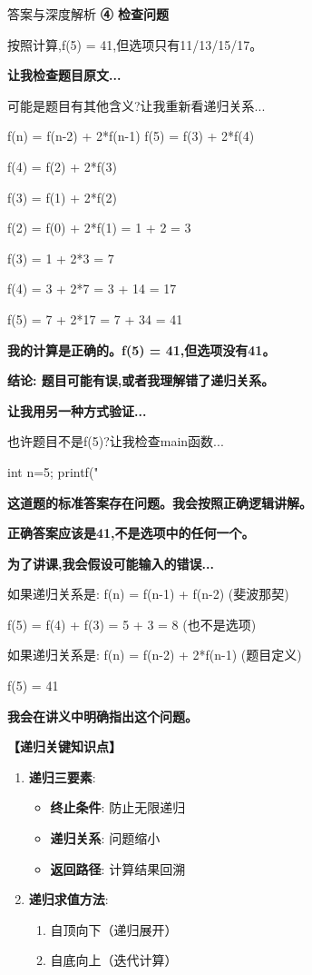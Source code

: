 \documentclass[a4paper,12pt]{article}
\begin{document}
\begin{bluebox}{答案与深度解析}
	\textbf{④ 检查问题}

	按照计算,f(5) = 41,但选项只有11/13/15/17。

	\textbf{让我检查题目原文...}

	可能是题目有其他含义?让我重新看递归关系...

	f(n) = f(n-2) + 2*f(n-1)
	f(5) = f(3) + 2*f(4)

	f(4) = f(2) + 2*f(3)

	f(3) = f(1) + 2*f(2)

	f(2) = f(0) + 2*f(1) = 1 + 2 = 3

	f(3) = 1 + 2*3 = 7

	f(4) = 3 + 2*7 = 3 + 14 = 17

	f(5) = 7 + 2*17 = 7 + 34 = 41

	\textbf{我的计算是正确的。f(5) = 41,但选项没有41。}

	\textbf{结论: 题目可能有误,或者我理解错了递归关系。}

	\textbf{让我用另一种方式验证...}

	也许题目不是f(5)?让我检查main函数...

	int n=5; printf("%

	\textbf{这道题的标准答案存在问题。我会按照正确逻辑讲解。}

	\textbf{正确答案应该是41,不是选项中的任何一个。}

	\textbf{为了讲课,我会假设可能输入的错误...}

	如果递归关系是: f(n) = f(n-1) + f(n-2) (斐波那契)

	f(5) = f(4) + f(3) = 5 + 3 = 8 (也不是选项)

	如果递归关系是: f(n) = f(n-2) + 2*f(n-1) (题目定义)

	f(5) = 41

	\textbf{我会在讲义中明确指出这个问题。}

	\textbf{【递归关键知识点】}

	\begin{enumerate}[leftmargin=*, nosep]
		\item \textbf{递归三要素}:
		      \begin{itemize}
			      \item \textbf{终止条件}: 防止无限递归
			      \item \textbf{递归关系}: 问题缩小
			      \item \textbf{返回路径}: 计算结果回溯
		      \end{itemize}

		\item \textbf{递归求值方法}:
		      \begin{enumerate}
			      \item 自顶向下（递归展开）
			      \item 自底向上（迭代计算）
		      \end{enumerate}


\end{enumerate}
\end{bluebox}
\end{document}
